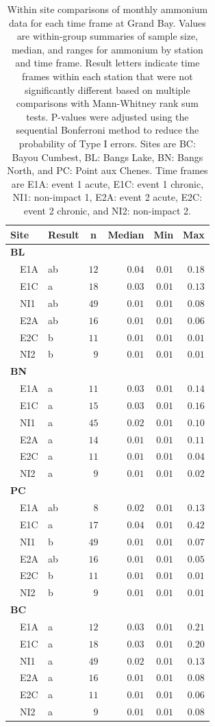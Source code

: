\documentclass[letterpaper,12pt]{article}\usepackage[]{graphicx}\usepackage[]{color}
\begin{document}
\begin{table}[!tbp]
\caption{Within site comparisons  of monthly ammonium data for each time frame at Grand Bay.  Values are within-group summaries of sample size, median, and ranges for ammonium by station and time frame.  Result letters indicate time frames within each station that were not significantly different based on multiple comparisons with Mann-Whitney rank sum tests.  P-values were adjusted using the sequential Bonferroni method to reduce the probability of Type I errors. Sites are BC: Bayou Cumbest, BL: Bangs Lake, BN: Bangs North, and PC: Point aux Chenes.  Time frames are E1A: event 1 acute, E1C: event 1 chronic, NI1: non-impact 1, E2A: event 2 acute, E2C: event 2 chronic, and NI2: non-impact 2.\label{tab:ammontab}} 
\begin{center}
\begin{tabular}{llrrrr}
\hline\hline
\multicolumn{1}{l}{Site}&\multicolumn{1}{c}{Result}&\multicolumn{1}{c}{n}&\multicolumn{1}{c}{Median}&\multicolumn{1}{c}{Min}&\multicolumn{1}{c}{Max}\tabularnewline
\hline
{\bfseries BL}&&&&&\tabularnewline
~~E1A&ab&$12$&$0.04$&$0.01$&$0.18$\tabularnewline
~~E1C&a&$18$&$0.03$&$0.01$&$0.13$\tabularnewline
~~NI1&ab&$49$&$0.01$&$0.01$&$0.08$\tabularnewline
~~E2A&ab&$16$&$0.01$&$0.01$&$0.06$\tabularnewline
~~E2C&b&$11$&$0.01$&$0.01$&$0.01$\tabularnewline
~~NI2&b&$ 9$&$0.01$&$0.01$&$0.01$\tabularnewline
\hline
{\bfseries BN}&&&&&\tabularnewline
~~E1A&a&$11$&$0.03$&$0.01$&$0.14$\tabularnewline
~~E1C&a&$15$&$0.03$&$0.01$&$0.16$\tabularnewline
~~NI1&a&$45$&$0.02$&$0.01$&$0.10$\tabularnewline
~~E2A&a&$14$&$0.01$&$0.01$&$0.11$\tabularnewline
~~E2C&a&$11$&$0.01$&$0.01$&$0.04$\tabularnewline
~~NI2&a&$ 9$&$0.01$&$0.01$&$0.02$\tabularnewline
\hline
{\bfseries PC}&&&&&\tabularnewline
~~E1A&ab&$ 8$&$0.02$&$0.01$&$0.13$\tabularnewline
~~E1C&a&$17$&$0.04$&$0.01$&$0.42$\tabularnewline
~~NI1&b&$49$&$0.01$&$0.01$&$0.07$\tabularnewline
~~E2A&ab&$16$&$0.01$&$0.01$&$0.05$\tabularnewline
~~E2C&b&$11$&$0.01$&$0.01$&$0.01$\tabularnewline
~~NI2&b&$ 9$&$0.01$&$0.01$&$0.01$\tabularnewline
\hline
{\bfseries BC}&&&&&\tabularnewline
~~E1A&a&$12$&$0.03$&$0.01$&$0.21$\tabularnewline
~~E1C&a&$18$&$0.03$&$0.01$&$0.20$\tabularnewline
~~NI1&a&$49$&$0.02$&$0.01$&$0.13$\tabularnewline
~~E2A&a&$16$&$0.01$&$0.01$&$0.08$\tabularnewline
~~E2C&a&$11$&$0.01$&$0.01$&$0.06$\tabularnewline
~~NI2&a&$ 9$&$0.01$&$0.01$&$0.08$\tabularnewline
\hline
\end{tabular}\end{center}
\end{table}
\end{document}

